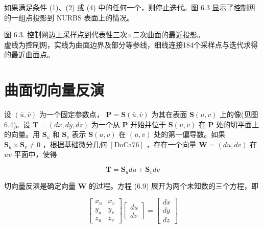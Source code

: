 \documentclass[../main.tex]{subfiles}
\begin{document}
如果满足条件 (1)、(2) 或 (4) 中的任何一个，则停止迭代。图 6.3 显示了控制网的一组点投影到 NURBS 表面上的情况。





\begin{center}
\begin{minipage}{20.5cm}
\vspace*{.6\baselineskip}
\centering
{}
\par\smallskip
图 6.3. 控制网边上采样点到代表性三次$\times$二次曲面的最近投影。\\
虚线为控制网，实线为曲面边界及部分等参线，细线连接184个采样点与迭代求得的最近曲面点。
\end{minipage}
\end{center}

\section{曲面切向量反演}

设 \(\left( {\bar{u},\bar{v}}\right)\) 为一个固定参数点， \(\mathbf{P} = \mathbf{S}\left( {\bar{u},\bar{v}}\right)\) 为其在表面 \(\mathbf{S}\left( {u,v}\right)\) 上的像(见图 6.4)。设 \(\mathbf{T} = \left( {{dx},{dy},{dz}}\right)\) 为一个从 \(\mathbf{P}\) 开始并位于 \(\mathbf{S}\left( {u,v}\right)\) 在 \(\mathbf{P}\) 处的切平面上的向量。用 \({\mathbf{S}}_{u}\) 和 \({\mathbf{S}}_{v}\) 表示 \(\mathbf{S}\left( {u,v}\right)\) 在 \(\left( {\bar{u},\bar{v}}\right)\) 处的第一偏导数。如果 \({\mathbf{S}}_{u} \times  {\mathbf{S}}_{v} \neq  0\) ，根据基础微分几何 \(\left\lbrack  {\mathrm{{DoCa}}{76}}\right\rbrack\) ，存在一个向量 \(\mathbf{W} = \left( {{du},{dv}}\right)\) 在 \({uv}\) 平面中，使得

\[
\mathbf{T} = {\mathbf{S}}_{u}{du} + {\mathbf{S}}_{v}{dv} \tag{6.9}
\]

切向量反演是确定向量 \(\mathbf{W}\) 的过程。方程 (6.9) 展开为两个未知数的三个方程，即

\[
\left\lbrack  \begin{array}{ll} {x}_{u} & {x}_{v} \\  {y}_{u} & {y}_{v} \\  {z}_{u} & {z}_{v} \end{array}\right\rbrack  \left\lbrack  \begin{array}{l} {du} \\  {dv} \end{array}\right\rbrack   = \left\lbrack  \begin{array}{l} {dx} \\  {dy} \\  {dz} \end{array}\right\rbrack   \tag{6.10}
\]
\end{document}
